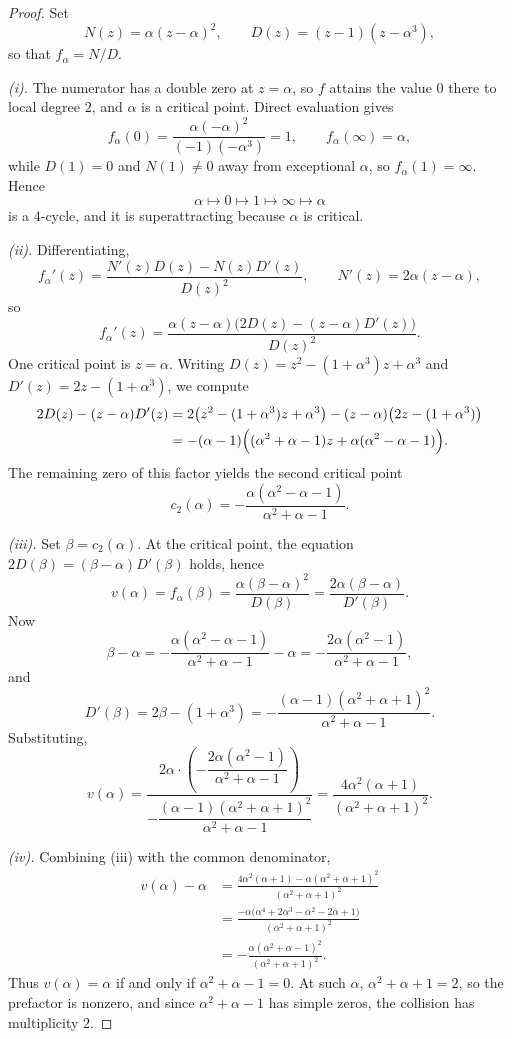 \documentclass[12pt]{article}
\theoremstyle{definition}
\theoremstyle{remark}
\numberwithin{equation}{section}
\begin{document}
\begin{proof}
Set
\[
N(z)=\alpha(z-\alpha)^{2},\qquad
D(z)=(z-1)(z-\alpha^{3}),
\]
so that $f_{\alpha}=N/D$.

\emph{(i).}  The numerator has a double zero at $z=\alpha$, so $f$
attains the value $0$ there to local degree $2$, and $\alpha$ is a
critical point.  Direct evaluation gives
\[
f_{\alpha}(0)=\frac{\alpha(-\alpha)^{2}}{(-1)(-\alpha^{3})}=1,\qquad
f_{\alpha}(\infty)=\alpha,
\]
while $D(1)=0$ and $N(1)\neq0$ away from exceptional $\alpha$, so
$f_{\alpha}(1)=\infty$.  Hence
\[
\alpha\longmapsto0\longmapsto1\longmapsto\infty\longmapsto\alpha
\]
is a $4$-cycle, and it is superattracting because $\alpha$ is critical.

\emph{(ii).}  Differentiating,
\[
f_{\alpha}'(z)=\frac{N'(z)D(z)-N(z)D'(z)}{D(z)^{2}},
\qquad N'(z)=2\alpha(z-\alpha),
\]
so
\[
f_{\alpha}'(z)
=\frac{\alpha(z-\alpha)\bigl(2D(z)-(z-\alpha)D'(z)\bigr)}{D(z)^{2}}.
\]
One critical point is $z=\alpha$.  Writing
$D(z)=z^{2}-(1+\alpha^{3})z+\alpha^{3}$ and
$D'(z)=2z-(1+\alpha^{3})$, we compute
\[
\begin{aligned}
2D(z)-(z-\alpha)D'(z)
&=2\bigl(z^{2}-(1+\alpha^{3})z+\alpha^{3}\bigr)
 -(z-\alpha)\bigl(2z-(1+\alpha^{3})\bigr)\\
&=-(\alpha-1)\Bigl((\alpha^{2}+\alpha-1)z
   +\alpha(\alpha^{2}-\alpha-1)\Bigr).
\end{aligned}
\]
The remaining zero of this factor yields the second critical point
\[
c_{2}(\alpha)
=-\frac{\alpha(\alpha^{2}-\alpha-1)}{\alpha^{2}+\alpha-1}.
\]

\emph{(iii).}  Set $\beta=c_{2}(\alpha)$.  At the critical point, the
equation $2D(\beta)=(\beta-\alpha)D'(\beta)$ holds, hence
\[
v(\alpha)=f_{\alpha}(\beta)
=\frac{\alpha(\beta-\alpha)^{2}}{D(\beta)}
=\frac{2\alpha(\beta-\alpha)}{D'(\beta)}.
\]
Now
\[
\beta-\alpha
=-\frac{\alpha(\alpha^{2}-\alpha-1)}{\alpha^{2}+\alpha-1}-\alpha
=-\frac{2\alpha(\alpha^{2}-1)}{\alpha^{2}+\alpha-1},
\]
and
\[
D'(\beta)
=2\beta-(1+\alpha^{3})
=-\frac{(\alpha-1)(\alpha^{2}+\alpha+1)^{2}}{\alpha^{2}+\alpha-1}.
\]
Substituting,
\[
v(\alpha)
=\frac{2\alpha\cdot\left(-\dfrac{2\alpha(\alpha^{2}-1)}{\alpha^{2}+\alpha-1}\right)}
        {-\dfrac{(\alpha-1)(\alpha^{2}+\alpha+1)^{2}}{\alpha^{2}+\alpha-1}}
=\frac{4\alpha^{2}(\alpha+1)}{(\alpha^{2}+\alpha+1)^{2}}.
\]

\emph{(iv).}  Combining (iii) with the common denominator,
\[
\begin{aligned}
v(\alpha)-\alpha
&=\frac{4\alpha^{2}(\alpha+1)-\alpha(\alpha^{2}+\alpha+1)^{2}}
        {(\alpha^{2}+\alpha+1)^{2}}\\
&=\frac{-\alpha\bigl(\alpha^{4}+2\alpha^{3}-\alpha^{2}-2\alpha+1\bigr)}
        {(\alpha^{2}+\alpha+1)^{2}}\\
&=-\frac{\alpha(\alpha^{2}+\alpha-1)^{2}}
        {(\alpha^{2}+\alpha+1)^{2}}.
\end{aligned}
\]
Thus $v(\alpha)=\alpha$ if and only if $\alpha^{2}+\alpha-1=0$.  At
such $\alpha$, $\alpha^{2}+\alpha+1=2$, so the prefactor is nonzero,
and since $\alpha^{2}+\alpha-1$ has simple zeros, the collision has
multiplicity $2$.


\end{proof}
\end{document}
